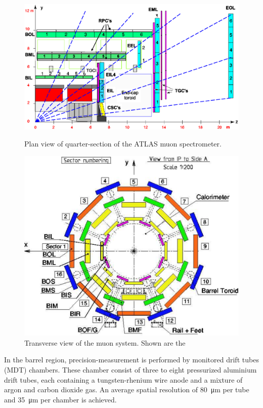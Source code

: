 \begin{figure}[tbhp]
  \centering
  \begin{minipage}[b]{0.47\textwidth}
    \includegraphics[width=\textwidth]{PartDetector/Diagrams/Muon_section.eps}
  \caption{Plan view of quarter-section of the ATLAS muon spectrometer.} \label{fig:DetectorMuonOverview}
  \end{minipage}
  \hfill
  \begin{minipage}[b]{0.47\textwidth}
   \includegraphics[width=\textwidth]{PartDetector/Diagrams/Muon_sector_numbering.pdf}
  \caption{Transverse view of the muon system. Shown are the } \label{fig:DetectorTransverse}
  \end{minipage}
\end{figure}

In the barrel region, precision-measurement is performed by monitored drift tubes (MDT) chambers. These chamber consist of three to eight pressurized aluminium drift tubes, each containing a tungsten-rhenium wire anode and a mixture of argon and carbon dioxide gas. An average spatial resolution of \SI{80}{\um} per tube and \SI{35}{\um} per chamber is achieved.

